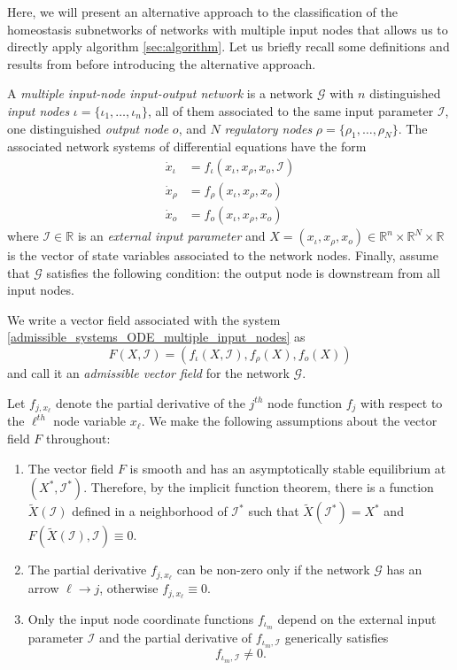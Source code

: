 \documentclass[pdflatex,sn-basic,Numbered]{sn-jnl}
\newcommand{\GG}{{\mathcal G}}
\theoremstyle{thmstyleone}%
\numberwithin{equation}{section}
\begin{document}
Here, we will present an alternative approach to the classification of the homeostasis subnetworks of networks with multiple input nodes that allows us to directly apply algorithm \ref{sec:algorithm}.
Let us briefly recall some definitions and results from \cite{madeira2022homeostasis} before introducing the alternative approach.

A \emph{multiple input-node input-output network} is a network $\mathcal{G}$ with $n$ distinguished \emph{input nodes} $\iota=\{\iota_{1}, \ldots, \iota_{n}\}$, all of them associated to the same input parameter $\mathcal{I}$, one distinguished \emph{output node} $o$, and $N$ \emph{regulatory nodes} $\rho=\{\rho_1,\ldots,\rho_N\}$.
The associated network systems of differential equations have the form
\begin{equation} \label{admissible_systems_ODE_multiple_input_nodes}
\begin{aligned}
\dot{x}_{\iota} & = f_{\iota}(x_{\iota}, x_{\rho}, x_{o}, \mathcal{I}) \\
\dot{x}_{\rho} & = f_{\rho}(x_{\iota}, x_{\rho}, x_{o})\\
\dot{x}_{o} & = f_{o}(x_{\iota}, x_{\rho}, x_{o})
\end{aligned}
\end{equation}
where $\mathcal{I}\in\mathbb{R}$ is an \emph{external input parameter} and $X=(x_{\iota},x_{\rho},x_o)\in\mathbb{R}^n\times\mathbb{R}^N\times\mathbb{R}$ is the vector of state variables associated to the network nodes.
Finally, assume that $\GG$ satisfies the following condition: the output node is downstream from all input nodes.

We write a vector field associated with the system \eqref{admissible_systems_ODE_multiple_input_nodes} as
\[
F(X,\mathcal{I})=(f_{\iota}(X,\mathcal{I}),f_\rho(X),f_o(X))
\]
and call it an \emph{admissible vector field} for the network $\mathcal{G}$.

Let $f_{j,x_\ell}$ denote the partial derivative of the $j^{th}$ node function $f_j$ with respect to the $\ell^{th}$ node variable $x_\ell$. We make the following assumptions about the vector field $F$ throughout:
\begin{enumerate}[label=(\alph*)]
\item The vector field $F$ is smooth and has an asymptotically stable equilibrium at $(X^*,\mathcal{I}^*)$. Therefore, by the implicit function theorem, there is a function $\tilde{X}(\mathcal{I})$ defined in a neighborhood of $\mathcal{I}^*$ such that $\tilde{X}(\mathcal{I}^*) = X^*$ and $F(\tilde{X}(\mathcal{I}), \mathcal{I}) \equiv 0$. 
\item The partial derivative $f_{j,x_\ell}$ can be non-zero only if the network $\mathcal{G}$ has an arrow $\ell\to j$, otherwise $f_{j,x_\ell} \equiv 0$.
\item Only the input node coordinate functions $f_{\iota_m}$ depend on the external input parameter $\mathcal{I}$ and the partial derivative of $f_{\iota_m,\mathcal{I}}$ generically satisfies
\begin{equation} \label{e:f_iota_I}
 f_{\iota_m,\mathcal{I}} \neq 0.
\end{equation}
\end{enumerate}
\end{document}
